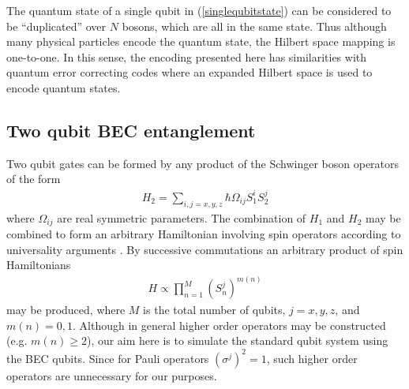 \documentclass[
aps,%
12pt,%
final,%
notitlepage,%
oneside,%
onecolumn,%
nobibnotes,%
nofootinbib,%
superscriptaddress,%
noshowpacs,%
centertags]%
{revtex4}
\begin{document}
The quantum state of a single qubit in (\ref{singlequbitstate}) can be considered to be ``duplicated'' over $ N $ bosons, which are all in the same state.  Thus although many physical particles encode the quantum state, the Hilbert space mapping is one-to-one.  In this sense, the encoding presented here has similarities with quantum error correcting codes where an expanded Hilbert space is used to encode quantum states.  

\subsection{Two qubit BEC entanglement}

Two qubit gates can be formed by any product of the Schwinger boson operators of the form
%
\begin{align}
H_2 = \sum_{i,j = x,y,z} \hbar \Omega_{i j} S^{i}_1 S^{j}_2 
\end{align}
%
where $ \Omega_{i j} $ are real symmetric parameters. The combination of $ H_1 $ and $ H_2$ may be combined to form an arbitrary Hamiltonian involving spin operators according to universality arguments \cite{lloyd95}. By successive commutations an arbitrary product of spin Hamiltonians 
%
\begin{align}
\label{generaltwoqubit}
H \propto \prod_{n=1}^M (S^j_n)^{m(n)} 
\end{align}
%
may be produced, where $ M $ is the total number of qubits, $ j = x,y,z $, and $ m(n) = 0,1 $. Although in general 
higher order operators may be constructed (e.g. $ m(n) \ge 2$), our aim here is to simulate the standard qubit system using the BEC qubits. Since for Pauli operators $ (\sigma^j)^2 = 1 $, such higher order operators are unnecessary for our purposes. 
\end{document}
